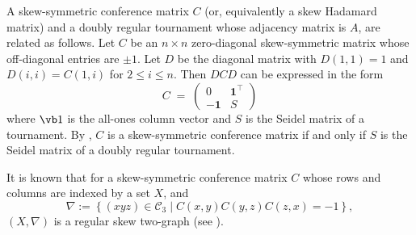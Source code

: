\documentclass[11pt,oneside]{amsart}
\begin{document}
{A skew-symmetric conference matrix $C$ (or, equivalently a skew Hadamard matrix) and a doubly regular tournament whose adjacency matrix is $A$, are related as follows.  
Let $C$ be an $n\times n$ zero-diagonal  skew-symmetric  matrix whose off-diagonal entries  are $\pm 1$. Let $D$ be the diagonal matrix with $D(1,1)=1$ and  $D(i,i)=C(1,i)$ for $2\leq i\leq n$. Then $DCD$ can be expressed in the form 
\[
C \;=\;
\begin{pmatrix}
0 & \mathbf{1}^\top \\
-\mathbf{1} & S
\end{pmatrix}
\]
where ${\vb 1}$ is the all-ones column vector and $S$ is the  Seidel  matrix of a tournament.%
 By \cite[Theorem~2]{reid1972doubly},  $C$ is a skew-symmetric conference matrix if and only if $S$ is the Seidel matrix of a doubly regular tournament. 


It is known  that for a skew-symmetric conference matrix $C$ whose rows and columns are indexed by a set $X$, and
\[
\nabla:=\left\{(xyz) \in \mathcal C_3\mid C(x,y)C(y,z)C(z,x)=-1\right\}, 
\]
$(X,\nabla)$ is a regular skew two-graph (see \cite[Section~3]{MR1344584}). 

}
\end{document}
